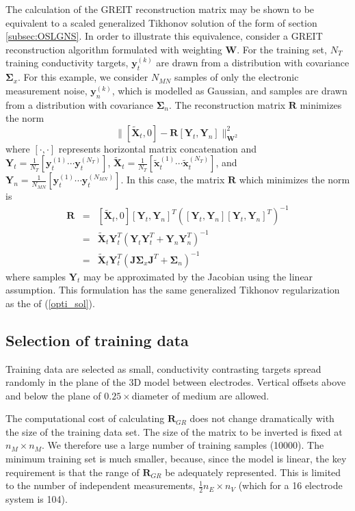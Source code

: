 \documentclass[12pt]{iopart}
\newcommand{\xT}{\mbox{$\mathbf{\tilde x}$}}
\newcommand{\XT}{\mbox{$\mathbf{\tilde X}$}}
\newcommand{\yB}{\mbox{$\mathbf{y}$}}
\newcommand{\RB}{\mbox{$\mathbf{R}$}}
\newcommand{\JB}{\mbox{$\mathbf{J}$}}
\newcommand{\WB}{\mbox{$\mathbf{W}$}}
\newcommand{\YB}{\mbox{$\mathbf{Y}$}}
\newcommand{\SG}{\mbox{${\boldsymbol \Sigma}$}}
\begin{document}
The calculation of the GREIT reconstruction matrix
may be shown to be equivalent to a scaled generalized
Tikhonov solution of the form of section \ref{subsec:OSLGNS}.
In order to illustrate this equivalence, consider
a GREIT reconstruction algorithm formulated
with weighting $\WB$. For the training set,
$N_T$ training conductivity targets, $\yB_t^{(k)}$ are drawn from
a distribution with covariance $\SG_x$.
For this example, we consider $N_{MN}$ samples of only the electronic
measurement noise, $\yB_n^{(k)}$, which is modelled as Gaussian,
and samples are drawn from a distribution with 
covariance $\SG_n$. The reconstruction matrix $\RB$ minimizes
the norm
\begin{equation}
\| [ \XT_t, 0 ] - \RB [ \YB_t, \YB_n ] \|_{\WB^2}^2
\end{equation}
where $[\cdot,\cdot]$ represents horizontal
matrix concatenation and
$\YB_t = \frac{1}{N_T}    [ \yB_t^{(1)} \cdots \yB_t^{(N_T)} ]$,
$\XT_t = \frac{1}{N_T}    [ \xT_t^{(1)} \cdots \xT_t^{(N_T)} ]$,
and 
$\YB_n = \frac{1}{N_{MN}} [ \yB_t^{(1)} \cdots \yB_t^{(N_{MN})} ]$.
In this case, the matrix $\RB$ which minimizes the norm is 
\begin{eqnarray}
\RB &=& [ \XT_t, 0 ] [\YB_t, \YB_n]^T
     \left( [\YB_t, \YB_n] [\YB_t, \YB_n]^T \right)^{-1}
\nonumber \\
    &=& \XT_t \YB_t^T \left( \YB_t \YB_t^T + \YB_n \YB_n^T \right)^{-1}
\nonumber \\
    &=& \XT_t \YB_t^T \left( \JB \SG_x \JB^T + \SG_n \right)^{-1}
\end{eqnarray}
where samples $\YB_t$ may be approximated by the Jacobian
using the linear assumption. This formulation 
has the same generalized Tikhonov regularization as the
of (\ref{opti_sol}).


\subsection{Selection of training data}
\label{subsec:training_data}

Training data are selected as small, conductivity contrasting
targets spread randomly in the plane of the 3D model
between electrodes. Vertical offsets above and below the
plane of $0.25\times$diameter of medium are allowed.

The computational cost of calculating $\RB_{GR}$ does
not change dramatically with the size of the training data
set. The size of the matrix to be inverted is fixed at
$n_M \times n_M$. We therefore use a large number of
training samples (10000). The minimum training set 
is much smaller, because, since the model is
linear, the key requirement is that the range of 
$\RB_{GR}$ be adequately represented. This is limited
to the number of independent measurements,
$\frac{1}{2} n_E \times n_V$ (which for a 16 electrode
system is 104).
\end{document}
